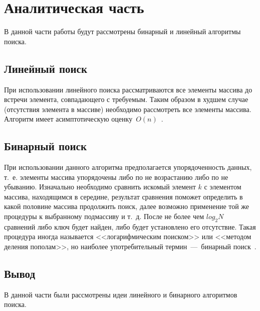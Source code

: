 \chapter{Аналитическая часть}
В данной части работы будут рассмотрены бинарный и линейный алгоритмы поиска.






\section{Линейный поиск}
При использовании линейного поиска рассматриваются все элементы массива до встречи элемента, совпадающего с требуемым. Таким образом в худшем случае (отсутствия элемента в массиве) необходимо рассмотреть все элементы массива. Алгоритм имеет асимптотическую оценку~$O(n)$~\cite{book_knut}.



\section{Бинарный поиск}
При использовании данного алгоритма предполагается упорядоченность данных, т.~е. элементы массива упорядочены либо по не возрастанию либо по не убыванию. Изначально необходимо сравнить искомый элемент $k$ с элементом массива, находящимся в середине, результат сравнения поможет определить в какой половине массива продолжить поиск, далее возможно применение той же процедуры к выбранному подмассиву и т.~д. После не более чем 
$log_{2}{N}$ сравнений либо ключ будет найден, либо будет установлено его отсутствие. Такая процедура иногда называется <<логарифмическим поиском>> или <<методом деления пополам>>, но наиболее
употребительный термин~---~бинарный поиск~\cite{book_knut}.









\section*{Вывод}
В данной части были рассмотрены идеи линейного и бинарного алгоритмов поиска.
